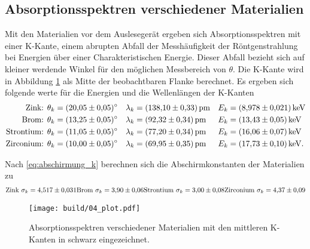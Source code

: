 \subsection{Absorptionsspektren verschiedener Materialien}
Mit den Materialien vor dem Auslesegerät ergeben sich Absorptionsspektren mit einer K-Kante, einem abrupten Abfall
der Messhäufigkeit der Röntgenstrahlung bei Energien über einer Charakteristischen Energie.
Dieser Abfall bezieht sich auf kleiner werdende Winkel für den möglichen Messbereich von $\theta$.
Die K-Kante wird in Abbildung \ref{fig:04} als Mitte der beobachtbaren Flanke berechnet.
Es ergeben sich folgende werte für die Energien und die Wellenlängen der K-Kanten
\begin{align}
    \text{Zink:       } \theta_k &= \qty{20.05 \pm 0.05}{\degree} & \lambda_k &= \qty{138.10 \pm 0.33}{\pico\meter} & E_k &= \qty{8.978 \pm 0.021}{ \kilo\eV } \\
    \label{eq:absorptionskanten}
    \text{Brom:       } \theta_k &= \qty{13.25 \pm 0.05}{\degree} & \lambda_k &= \qty{92.32 \pm 0.34 }{\pico\meter} & E_k &= \qty{13.43 \pm 0.05 }{ \kilo\eV }\\
    \text{Strontium:  } \theta_k &= \qty{11.05 \pm 0.05}{\degree} & \lambda_k &= \qty{77.20 \pm 0.34 }{\pico\meter} & E_k &= \qty{16.06 \pm 0.07 }{ \kilo\eV }\\
    \text{Zirconium:  } \theta_k &= \qty{10.00 \pm 0.05}{\degree} & \lambda_k &= \qty{69.95 \pm 0.35 }{\pico\meter} & E_k &= \qty{17.73 \pm 0.10}{\kilo\eV}. \\
\end{align}

\noindent
Nach \eqref{eq:abschirmung_k} berechnen sich die Abschirmkonstanten der Materialien zu
\begin{align}
    \text{Zink      } \sigma_k = \num{4.517 \pm 0.031}
    \text{Brom      } \sigma_k = \num{3.90 \pm 0.06}
    \text{Strontium } \sigma_k = \num{3.00 \pm 0.08}
    \text{Zirconium } \sigma_k = \num{4.37 \pm 0.09}
\end{align}

\begin{figure}
    \centering
    \texttt{[image: build/04\_plot.pdf]}
    \caption{Absorptionsspektren verschiedener Materialien mit den mittleren K-Kanten in schwarz eingezeichnet.}
    \label{fig:04}
\end{figure}






